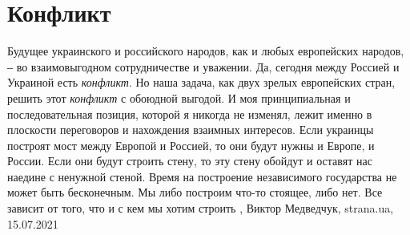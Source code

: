  
 
 
 
 
\chapter{Конфликт}

Будущее украинского и российского народов, как и любых европейских народов, ‒
во взаимовыгодном сотрудничестве и уважении. Да, сегодня между Россией и
Украиной есть \emph{конфликт}. Но наша задача, как двух зрелых европейских стран,
решить этот \emph{конфликт} с обоюдной выгодой. И моя принципиальная и
последовательная позиция, которой я никогда не изменял, лежит именно в
плоскости переговоров и нахождения взаимных интересов. Если украинцы построят
мост между Европой и Россией, то они будут нужны и Европе, и России. Если они
будут строить стену, то эту стену обойдут и оставят нас наедине с ненужной
стеной. Время на построение независимого государства не может быть бесконечным.
Мы либо построим что-то стоящее, либо нет. Все зависит от того, что и с кем мы
хотим строить
, 
Виктор Медведчук, strana.ua, 15.07.2021

